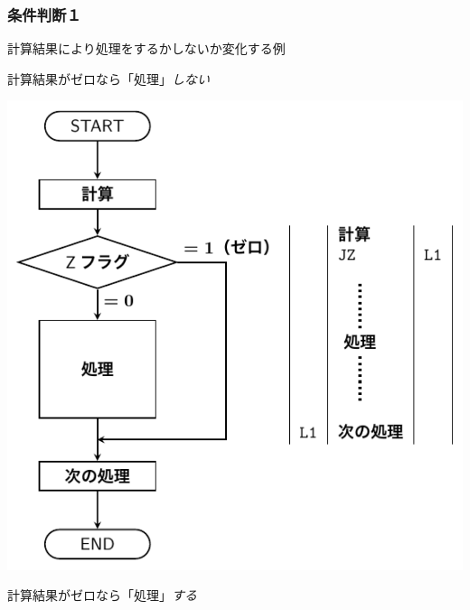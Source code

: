 \documentclass{beamer}                 %
\begin{document}
\begin{frame}
  \frametitle{条件判断１}
  計算結果により処理をするかしないか変化する例
  \vfill
  \begin{minipage}{0.49\columnwidth}
    \begin{itembox}[l]{\footnotesize 計算結果がゼロなら「処理」\emph{しない}}
      \centerline{\includegraphics[scale=0.6]{../Tikz/flow2AB.pdf}}
    \end{itembox}
  \end{minipage}
  \begin{minipage}{0.5\columnwidth}
    \begin{itembox}[l]{\footnotesize 計算結果がゼロなら「処理」\emph{する}}

\end{itembox}
\end{minipage}
\end{frame}
\end{document}
